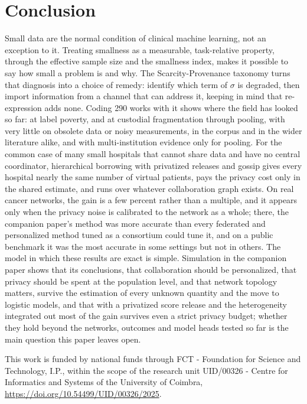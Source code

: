 \documentclass[acmsmall,screen,review]{acmart}
\theoremstyle{acmdefinition}
\begin{document}
\section{Conclusion}\label{sec:conclusion}

Small data are the normal condition of clinical machine learning, not an exception to it. Treating smallness as a measurable, task-relative property, through the effective sample size and the smallness index, makes it possible to say how small a problem is and why. The Scarcity-Provenance taxonomy turns that diagnosis into a choice of remedy: identify which term of $\sigma$ is degraded, then import information from a channel that can address it, keeping in mind that re-expression adds none. Coding 290 works with it shows where the field has looked so far: at label poverty, and at custodial fragmentation through pooling, with very little on obsolete data or noisy measurements, in the corpus and in the wider literature alike, and with multi-institution evidence only for pooling. For the common case of many small hospitals that cannot share data and have no central coordinator, hierarchical borrowing with privatized releases and gossip gives every hospital nearly the same number of virtual patients, pays the privacy cost only in the shared estimate, and runs over whatever collaboration graph exists. On real cancer networks, the gain is a few percent rather than a multiple, and it appears only when the privacy noise is calibrated to the network as a whole; there, the companion paper's method was more accurate than every federated and personalized method tuned as a consortium could tune it, and on a public benchmark it was the most accurate in some settings but not in others. The model in which these results are exact is simple. Simulation in the companion paper shows that its conclusions, that collaboration should be personalized, that privacy should be spent at the population level, and that network topology matters, survive the estimation of every unknown quantity and the move to logistic models, and that with a privatized score release and the heterogeneity integrated out most of the gain survives even a strict privacy budget; whether they hold beyond the networks, outcomes and model heads tested so far is the main question this paper leaves open.

\begin{acks}
This work is funded by national funds through FCT - Foundation for Science and Technology, I.P., within the scope of the research unit UID/00326 - Centre for Informatics and Systems of the University of Coimbra, \url{https://doi.org/10.54499/UID/00326/2025}.
\end{acks}




\nocite{brasil2019artificial,brown2020language,kairouz2021advances}

\end{document}
